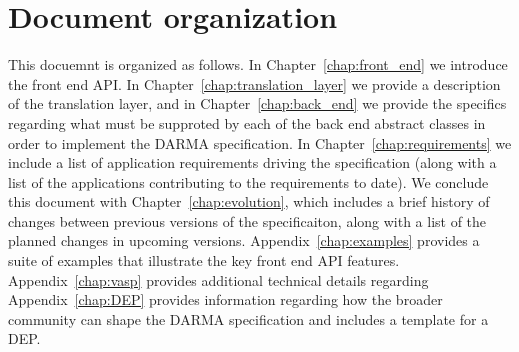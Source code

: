 






\section{Document organization}
\label{sec:organization}
This docuemnt is organized as follows.  In Chapter~\ref{chap:front_end} we
introduce the \gls{front end} \gls{API}.  In
Chapter~\ref{chap:translation_layer} we
provide a description of the \gls{translation layer}, and in
Chapter~\ref{chap:back_end} we provide the specifics regarding what must be
supproted by each of the \gls{back end} abstract classes in order to implement
the DARMA specification. In Chapter~\ref{chap:requirements} we include a list
of application requirements driving the specification (along with a list of the
    applications contributing to the requirements to date).
We conclude this document with
Chapter~\ref{chap:evolution}, which includes a brief history of changes between
previous versions of the specificaiton, along with a list of the planned changes 
in upcoming versions.
Appendix~\ref{chap:examples} provides a suite of examples that illustrate the
key \gls{front end} \gls{API} features. Appendix~\ref{chap:vasp} provides
additional technical details regarding %
Appendix~\ref{chap:DEP} provides information regarding how the broader
community can shape the \gls{DARMA} specification and includes a template for 
a \gls{DEP}. 

